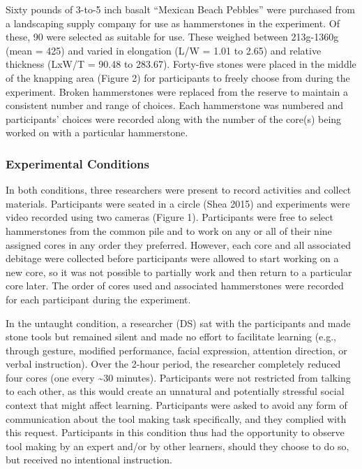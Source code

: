 \documentclass[smallextended]{svjour3}       %
\begin{document}
Sixty pounds of 3-to-5 inch basalt ``Mexican Beach Pebbles'' were
purchased from a landscaping supply company for use as hammerstones in
the experiment. Of these, 90 were selected as suitable for use. These
weighed between 213g-1360g (mean = 425) and varied in elongation (L/W =
1.01 to 2.65) and relative thickness (LxW/T = 90.48 to 283.67).
Forty-five stones were placed in the middle of the knapping area (Figure
2) for participants to freely choose from during the experiment. Broken
hammerstones were replaced from the reserve to maintain a consistent
number and range of choices. Each hammerstone was numbered and
participants' choices were recorded along with the number of the core(s)
being worked on with a particular hammerstone.\\

\hypertarget{experimental-conditions}{%
\subsubsection{\texorpdfstring{\textbf{Experimental
Conditions}}{Experimental Conditions}}\label{experimental-conditions}}

In both conditions, three researchers were present to record activities
and collect materials. Participants were seated in a circle (Shea 2015)
and experiments were video recorded using two cameras (Figure 1).
Participants were free to select hammerstones from the common pile and
to work on any or all of their nine assigned cores in any order they
preferred. However, each core and all associated debitage were collected
before participants were allowed to start working on a new core, so it
was not possible to partially work and then return to a particular core
later. The order of cores used and associated hammerstones were recorded
for each participant during the experiment.

In the untaught condition, a researcher (DS) sat with the participants
and made stone tools but remained silent and made no effort to
facilitate learning (e.g., through gesture, modified performance, facial
expression, attention direction, or verbal instruction). Over the 2-hour
period, the researcher completely reduced four cores (one every
\textasciitilde30 minutes). Participants were not restricted from
talking to each other, as this would create an unnatural and potentially
stressful social context that might affect learning. Participants were
asked to avoid any form of communication about the tool making task
specifically, and they complied with this request. Participants in this
condition thus had the opportunity to observe tool making by an expert
and/or by other learners, should they choose to do so, but received no
intentional instruction.
\end{document}
